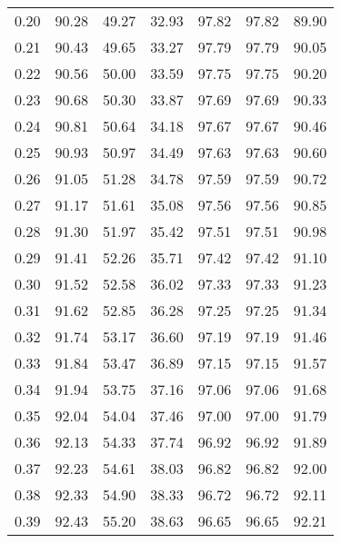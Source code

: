\begin{tabular}{|c|c|c|c|c|c|c|}
      0.20 &     90.28 &     49.27 &      32.93 &   97.82 &      97.82 &         89.90 \\
      0.21 &     90.43 &     49.65 &      33.27 &   97.79 &      97.79 &         90.05 \\
      0.22 &     90.56 &     50.00 &      33.59 &   97.75 &      97.75 &         90.20 \\
      0.23 &     90.68 &     50.30 &      33.87 &   97.69 &      97.69 &         90.33 \\
      0.24 &     90.81 &     50.64 &      34.18 &   97.67 &      97.67 &         90.46 \\
      0.25 &     90.93 &     50.97 &      34.49 &   97.63 &      97.63 &         90.60 \\
      0.26 &     91.05 &     51.28 &      34.78 &   97.59 &      97.59 &         90.72 \\
      0.27 &     91.17 &     51.61 &      35.08 &   97.56 &      97.56 &         90.85 \\
      0.28 &     91.30 &     51.97 &      35.42 &   97.51 &      97.51 &         90.98 \\
      0.29 &     91.41 &     52.26 &      35.71 &   97.42 &      97.42 &         91.10 \\
      0.30 &     91.52 &     52.58 &      36.02 &   97.33 &      97.33 &         91.23 \\
      0.31 &     91.62 &     52.85 &      36.28 &   97.25 &      97.25 &         91.34 \\
      0.32 &     91.74 &     53.17 &      36.60 &   97.19 &      97.19 &         91.46 \\
      0.33 &     91.84 &     53.47 &      36.89 &   97.15 &      97.15 &         91.57 \\
      0.34 &     91.94 &     53.75 &      37.16 &   97.06 &      97.06 &         91.68 \\
      0.35 &     92.04 &     54.04 &      37.46 &   97.00 &      97.00 &         91.79 \\
      0.36 &     92.13 &     54.33 &      37.74 &   96.92 &      96.92 &         91.89 \\
      0.37 &     92.23 &     54.61 &      38.03 &   96.82 &      96.82 &         92.00 \\
      0.38 &     92.33 &     54.90 &      38.33 &   96.72 &      96.72 &         92.11 \\
      0.39 &     92.43 &     55.20 &      38.63 &   96.65 &      96.65 &         92.21 \\

\end{tabular}
